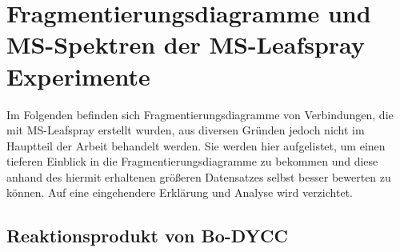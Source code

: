 \chapter{Fragmentierungsdiagramme und MS-Spektren der MS-Leafspray Experimente}

Im Folgenden befinden sich Fragmentierungsdiagramme von Verbindungen, die mit MS-Leafspray erstellt wurden, aus diversen Gründen jedoch nicht im Hauptteil der Arbeit behandelt werden. Sie werden hier aufgelistet, um einen tieferen Einblick in die Fragmentierungsdiagramme zu bekommen und diese anhand des hiermit erhaltenen größeren Datensatzes selbst besser bewerten zu können. Auf eine eingehendere Erklärung und Analyse wird verzichtet.

\section{Reaktionsprodukt von Bo-DYCC}

